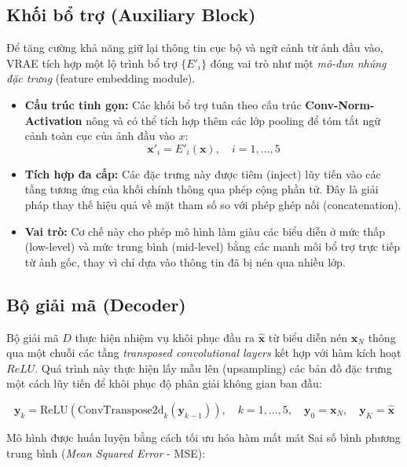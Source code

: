 \subsection{Khối bổ trợ (Auxiliary Block)}
Để tăng cường khả năng giữ lại thông tin cục bộ và ngữ cảnh từ ảnh đầu vào, VRAE tích hợp một lộ trình bổ trợ $\{E'_i\}$ đóng vai trò như một \textit{mô-đun nhúng đặc trưng} (feature embedding module).

\begin{itemize}
    \item \textbf{Cấu trúc tinh gọn:} Các khối bổ trợ tuân theo cấu trúc \textbf{Conv-Norm-Activation} nông và có thể tích hợp thêm các lớp pooling để tóm tắt ngữ cảnh toàn cục của ảnh đầu vào $x$:
    \begin{equation}
        \mathbf{x}'_i = E'_i(\mathbf{x}), \quad i = 1, \dots, 5
    \end{equation}
    \item \textbf{Tích hợp đa cấp:} Các đặc trưng này được tiêm (inject) lũy tiến vào các tầng tương ứng của khối chính thông qua phép cộng phần tử. Đây là giải pháp thay thế hiệu quả về mặt tham số so với phép ghép nối (concatenation).
    \item \textbf{Vai trò:} Cơ chế này cho phép mô hình làm giàu các biểu diễn ở mức thấp (low-level) và mức trung bình (mid-level) bằng các manh mối bổ trợ trực tiếp từ ảnh gốc, thay vì chỉ dựa vào thông tin đã bị nén qua nhiều lớp.
\end{itemize}

\subsection{Bộ giải mã (Decoder)}
Bộ giải mã $D$ thực hiện nhiệm vụ khôi phục đầu ra $\hat{\mathbf{x}}$ từ biểu diễn nén $\mathbf{x}_N$ thông qua một chuỗi các tầng \textit{transposed convolutional layers} kết hợp với hàm kích hoạt $ReLU$. Quá trình này thực hiện lấy mẫu lên (upsampling) các bản đồ đặc trưng một cách lũy tiến để khôi phục độ phân giải không gian ban đầu:

\begin{equation}
    \mathbf{y}_k = \text{ReLU}(\text{ConvTranspose2d}_k(\mathbf{y}_{k-1})), \quad k=1, \dots, 5, \quad \mathbf{y}_0 = \mathbf{x}_N, \quad \mathbf{y}_K = \hat{\mathbf{x}}
\end{equation}

Mô hình được huấn luyện bằng cách tối ưu hóa hàm mất mát Sai số bình phương trung bình (\textit{Mean Squared Error} - MSE):

